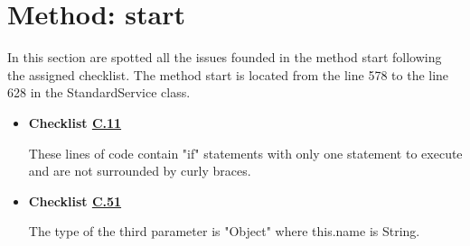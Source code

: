 \documentclass[../../../../codeInspection.tex]{subfiles}
\begin{document}
	\section{Method: start}

		In this section are spotted all the issues founded in the method start following the assigned checklist.
		The method start is located from the line 578 to the line 628 in the StandardService class.
		\begin{itemize}

			\item \textbf{Checklist \hyperref[C:11]{C.11}}

				  

				  

				  These lines of code contain "if" statements with only one statement to execute and are not surrounded by curly braces.

			\item \textbf{Checklist \hyperref[C:51]{C.51}}

				  

				  The type of the third parameter is "Object" where this.name is String.

		\end{itemize}
\end{document}
